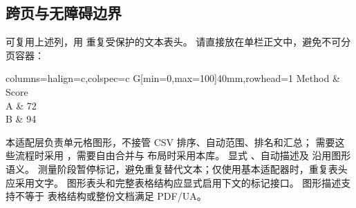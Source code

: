 \subsection{跨页与无障碍边界}
 可复用上述列，用  重复受保护的文本表头。
请直接放在单栏正文中，避免不可分页容器：
\begin{codeonly}
\begin{center}
\begin{longtblr}{columns={halign=c},colspec={c G[min=0,max=100]{40mm}},rowhead=1}
Method & {Score}\\
A & 72\\
B & 94\\
\end{longtblr}
\end{center}
\end{codeonly}
本适配层负责单元格图形，不接管 CSV 排序、自动范围、排名和汇总；
需要这些流程时采用 ，需要自由合并与  布局时采用本库。
显式 、自动描述及  沿用图形语义。
测量阶段暂停标记，避免重复替代文本；仅使用基本适配器时，重复表头应采用文字。
图形表头和完整表格结构应显式启用下文的标记接口。
图形描述支持不等于  表格结构或整份文档满足 PDF/UA。

